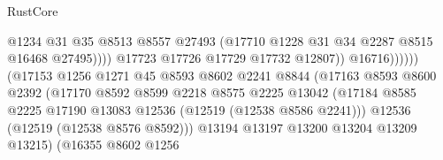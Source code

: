 \begin{lexlean}{RustCore}
\begin{coremodule}
                                                  @1234
                                                  @31
                                                  @35
                                                  @8513
                                                  @8557
                                                  @27493
                                                  (@17710
                                                    @1228
                                                    @31
                                                    @34
                                                    @2287
                                                    @8515
                                                    @16468
                                                    @27495))))
                                            @17723
                                            @17726
                                            @17729
                                            @17732
                                            @12807))
                                        @16716))))))
                            (@17153
                              @1256
                              @1271
                              @45
                              @8593
                              @8602
                              @2241
                              @8844
                              (@17163
                                @8593
                                @8600
                                @2392
                                (@17170
                                  @8592
                                  @8599
                                  @2218
                                  @8575
                                  @2225
                                  @13042
                                  (@17184
                                    @8585
                                    @2225
                                    @17190
                                    @13083
                                    @12536
                                    (@12519 (@12538 @8586 @2241)))
                                  @12536
                                  (@12519 (@12538 @8576 @8592)))
                                @13194
                                @13197
                                @13200
                                @13204
                                @13209
                                @13215)
                              (@16355
                                @8602
                                @1256

\end{coremodule}
\end{lexlean}
